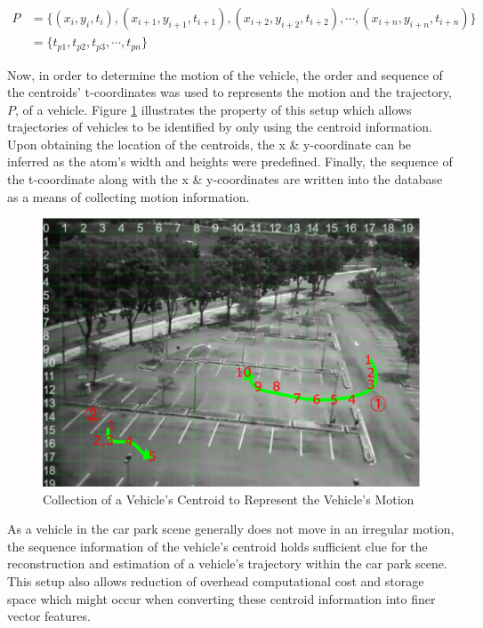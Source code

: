 \begin{align}
    P &= \{ (x_i, y_i, t_i), (x_{i+1}, y_{i+1}, t_{i+1}), (x_{i+2}, y_{i+2}, t_{i+2}), \dotsb,(x_{i+n}, y_{i+n}, t_{i+n})\}  \nonumber \\
      &= \{ t_{p1}, t_{p2}, t_{p3}, \dotsb, t_{pn}\}
\end{align}


Now, in order to determine the motion of the vehicle, the order and sequence of the centroids' t-coordinates was used to represents the motion and the trajectory, $P$, of a vehicle. Figure \ref{fig:motionExample} illustrates the property of this setup which allows trajectories of vehicles to be identified by only using the centroid information. Upon obtaining the location of the centroids, the x \& y-coordinate can be inferred as the atom's width and heights were predefined. Finally, the sequence of the t-coordinate along with the x \& y-coordinates are written into the database as a means of collecting motion information.

\begin{figure}[hbt!]\centering
\includegraphics[width=.9\textwidth]{image/general/trajectorysample2.png}
\caption{Collection of a Vehicle's Centroid to Represent the Vehicle's Motion}
\label{fig:motionExample}
\end{figure}

As a vehicle in the car park scene generally does not move in an irregular motion, the sequence information of the vehicle's centroid holds sufficient clue for the reconstruction and estimation of a vehicle's trajectory within the car park scene. This setup also allows reduction of overhead computational cost and storage space which might occur when converting these centroid information into finer vector features. 

